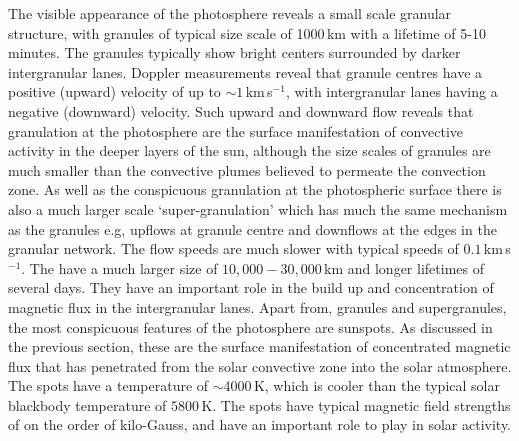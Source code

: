 The visible appearance of the photosphere reveals a small scale granular structure, with granules of typical size scale of 1000\,km with a lifetime of 5-10 minutes. The granules typically show bright centers surrounded by darker intergranular lanes. Doppler measurements reveal that granule centres have a positive (upward) velocity of up to $\sim1$\,km\,s$^{-1}$, with intergranular lanes having a negative (downward) velocity. Such upward and downward flow reveals that granulation at the photosphere are the surface manifestation of convective activity in the deeper layers of the sun, although the size scales of granules are much smaller than the convective plumes believed to permeate the convection zone. As well as the conspicuous granulation at the photospheric surface there is also a much larger scale \textquoteleft super-granulation' which has much the same mechanism as the granules e.g, upflows at granule centre and downflows at the edges in the granular network. The flow speeds are much slower with typical speeds of $0.1$\,km\,s$^{-1}$. The have a much larger size of $10,000-30,000$\,km and longer lifetimes of several days. They have an important role in the build up and concentration of magnetic flux in the intergranular lanes. Apart from, granules and supergranules, the most conspicuous features of the photosphere are sunspots. As discussed in the previous section, these are the surface manifestation of concentrated magnetic flux that has penetrated from the solar convective zone into the solar atmosphere. The spots have a temperature of $\sim4000$\,K, which is cooler than the typical solar blackbody temperature of $5800$\,K. The spots have typical magnetic field strengths of on the order of kilo-Gauss, and have an important role to play in solar activity.


